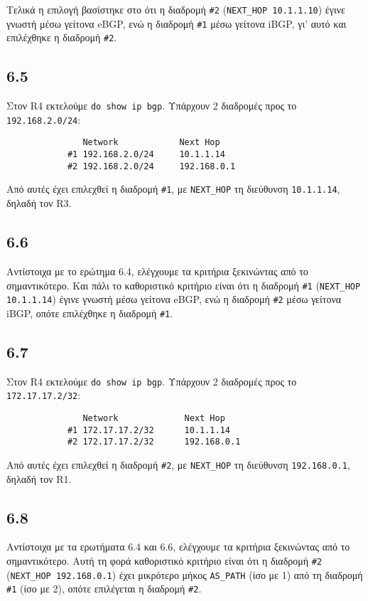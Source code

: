 \documentclass[a4paper, 12pt]{article}
\begin{document}
		Τελικά η επιλογή βασίστηκε στο ότι η διαδρομή \verb|#2| (\verb|NEXT_HOP 10.1.1.10|) έγινε γνωστή μέσω γείτονα eBGP, ενώ η διαδρομή \verb|#1| μέσω γείτονα iBGP, γι' αυτό και επιλέχθηκε η διαδρομή \verb|#2|.

	\subsection*{6.5}
		Στον R4 εκτελούμε \verb|do show ip bgp|. Υπάρχουν 2 διαδρομές προς το \verb|192.168.2.0/24|:
		
		\begin{verbatim}
			   Network            Next Hop
			#1 192.168.2.0/24     10.1.1.14
			#2 192.168.2.0/24     192.168.0.1
		\end{verbatim}

		Από αυτές έχει επιλεχθεί η διαδρομή \verb|#1|, με \verb|NEXT_HOP| τη διεύθυνση \verb|10.1.1.14|, δηλαδή τον R3.		

	\subsection*{6.6}
		Αντίστοιχα με το ερώτημα 6.4, ελέγχουμε τα κριτήρια ξεκινώντας από το σημαντικότερο. Kαι πάλι το καθοριστικό κριτήριο είναι ότι η διαδρομή \verb|#1| (\verb|NEXT_HOP 10.1.1.14|) έγινε γνωστή μέσω γείτονα eBGP, ενώ η διαδρομή \verb|#2| μέσω γείτονα iBGP, οπότε επιλέχθηκε η διαδρομή \verb|#1|.

	\subsection*{6.7}
		Στον R4 εκτελούμε \verb|do show ip bgp|. Υπάρχουν 2 διαδρομές προς το \verb|172.17.17.2/32|:
		
		\begin{verbatim}
			   Network             Next Hop
			#1 172.17.17.2/32      10.1.1.14
			#2 172.17.17.2/32      192.168.0.1
		\end{verbatim}
		
		Από αυτές έχει επιλεχθεί η διαδρομή \verb|#2|, με \verb|NEXT_HOP| τη διεύθυνση \verb|192.168.0.1|, δηλαδή τον R1.

	\subsection*{6.8}
		Αντίστοιχα με τα ερωτήματα 6.4 και 6.6, ελέγχουμε τα κριτήρια ξεκινώντας από το σημαντικότερο. Αυτή τη φορά καθοριστικό κριτήριο είναι ότι η διαδρομή \verb|#2| (\verb|NEXT_HOP 192.168.0.1|) έχει μικρότερο μήκος \verb|AS_PATH| (ίσο με 1) από τη διαδρομή \verb|#1| (ίσο με 2), οπότε επιλέγεται η διαδρομή \verb|#2|. 
\end{document}

